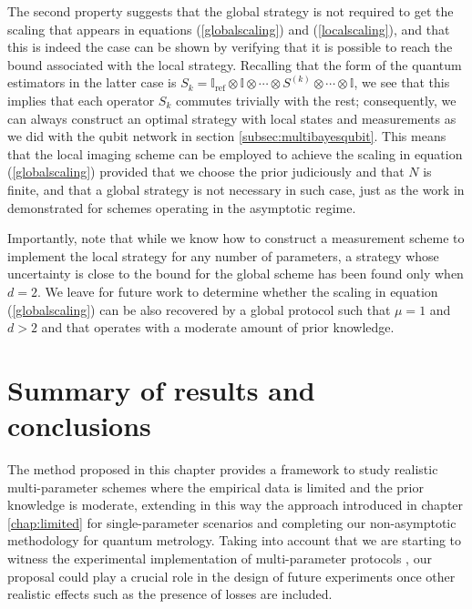 The second property suggests that the global strategy is not required to get the scaling that appears in equations (\ref{globalscaling}) and (\ref{localscaling}), and that this is indeed the case can be shown by verifying that it is possible to reach the bound associated with the local strategy. Recalling that the form of the quantum estimators in the latter case is $S_k =  \mathbb{I}_{\mathrm{ref}}\otimes\mathbb{I}\otimes \cdots \otimes S^{(k)} \otimes\cdots \otimes \mathbb{I}$, we see that this implies that each operator $S_k$ commutes trivially with the rest; consequently, we can always construct an optimal strategy with local states and measurements as we did with the qubit network in section \ref{subsec:multibayesqubit}. This means that the local imaging scheme can be employed to achieve the scaling in equation (\ref{globalscaling}) provided that we choose the prior judiciously and that $N$ is finite, and that a global strategy is not necessary in such case, just as the work in \cite{knott2016local} demonstrated for schemes operating in the asymptotic regime. 

Importantly, note that while we know how to construct a measurement scheme to implement the local strategy for any number of parameters, a strategy whose uncertainty is close to the bound for the global scheme has been found only when $d=2$. We leave for future work to determine whether the scaling in equation (\ref{globalscaling}) can be also recovered by a global protocol such that $\mu = 1$ and $d>2$ and that operates with a moderate amount of prior knowledge.

\section{Summary of results and conclusions}

The method proposed in this chapter provides a framework to study realistic multi-parameter schemes where the empirical data is limited and the prior knowledge is moderate, extending in this way the approach introduced in chapter \ref{chap:limited} for single-parameter scenarios and completing our non-asymptotic methodology for quantum metrology. Taking into account that we are starting to witness the experimental implementation of multi-parameter protocols \cite{roccia2018, polino2018}, our proposal could play a crucial role in the design of future experiments once other realistic effects such as the presence of losses are included.

